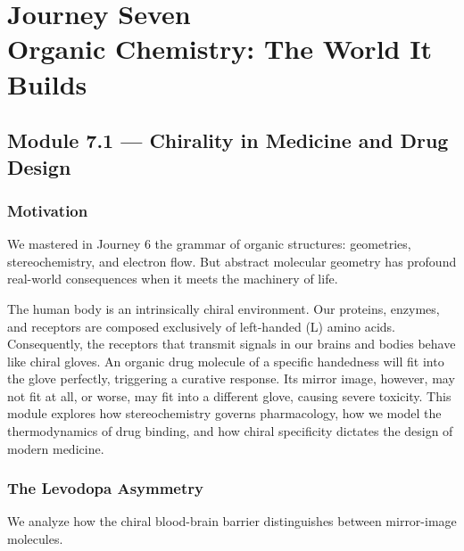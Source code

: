 \documentclass[12pt, a4paper]{book}
\begin{document}
\setcounter{chapter}{6}
\chapter[Journey 7 --- Organic Chemistry: The World It Builds]
        {Journey Seven\\[8pt]
         \textcolor{ModuleColor}{\large Organic Chemistry: The World It Builds}}
\setcounter{section}{0}

\section{Module 7.1 --- Chirality in Medicine and Drug Design}
\label{sec:mod7.1}

\subsection*{Motivation}

We mastered in Journey 6 the grammar of organic structures: geometries, stereochemistry, and electron flow.
But abstract molecular geometry has profound real-world consequences when it meets the machinery of life.

The human body is an intrinsically chiral environment.
Our proteins, enzymes, and receptors are composed exclusively of left-handed (L) amino acids.
Consequently, the receptors that transmit signals in our brains and bodies behave like chiral gloves.
An organic drug molecule of a specific handedness will fit into the glove perfectly, triggering a curative response.
Its mirror image, however, may not fit at all, or worse, may fit into a different glove, causing severe toxicity.
This module explores how stereochemistry governs pharmacology, how we model the thermodynamics of drug binding, and how chiral specificity dictates the design of modern medicine.

\subsection{The Levodopa Asymmetry}

We analyze how the chiral blood-brain barrier distinguishes between mirror-image molecules.
\end{document}
